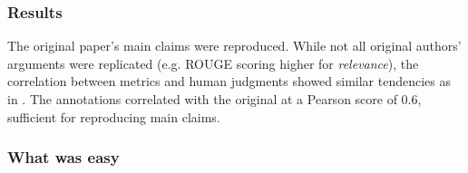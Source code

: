 
\subsubsection*{Results}

The original paper's main claims were reproduced. While not all original authors' arguments were replicated (e.g. ROUGE scoring higher for \textit{relevance}), the correlation between metrics and human judgments showed similar tendencies as in \cite{gao2022dialsummeval}. The annotations correlated with the original at a Pearson score of 0.6, sufficient for reproducing main claims. 


\subsubsection*{What was easy}

